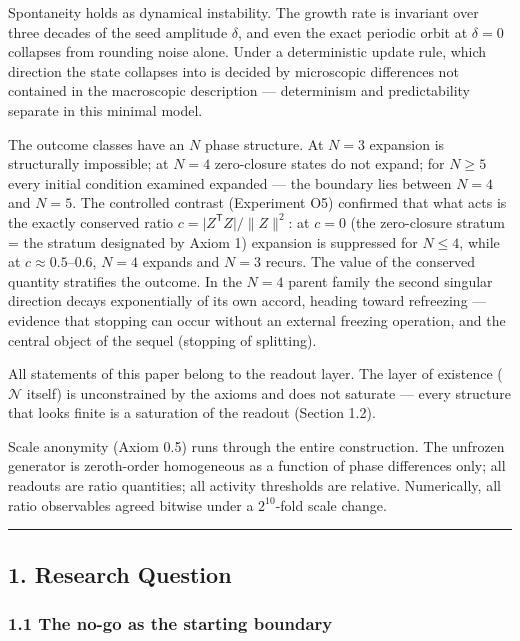 \documentclass[
  a4paper,
]{article}
\begin{document}
Spontaneity holds as dynamical instability. The growth rate is invariant
over three decades of the seed amplitude \(\delta\), and even the exact
periodic orbit at \(\delta=0\) collapses from rounding noise alone.
Under a deterministic update rule, which direction the state collapses
into is decided by microscopic differences not contained in the
macroscopic description --- determinism and predictability separate in
this minimal model.

The outcome classes have an \(N\) phase structure. At \(N=3\) expansion
is structurally impossible; at \(N=4\) zero-closure states do not
expand; for \(N\ge5\) every initial condition examined expanded --- the
boundary lies between \(N=4\) and \(N=5\). The controlled contrast
(Experiment O5) confirmed that what acts is the exactly conserved ratio
\(c=\lvert Z^{\mathsf T}Z\rvert/\lVert Z\rVert^2\): at \(c=0\) (the
zero-closure stratum = the stratum designated by Axiom 1) expansion is
suppressed for \(N\le4\), while at \(c\approx0.5\)--\(0.6\), \(N=4\)
expands and \(N=3\) recurs. The value of the conserved quantity
stratifies the outcome. In the \(N=4\) parent family the second singular
direction decays exponentially of its own accord, heading toward
refreezing --- evidence that stopping can occur without an external
freezing operation, and the central object of the sequel (stopping of
splitting).

All statements of this paper belong to the readout layer. The layer of
existence (\(\mathcal N\) itself) is unconstrained by the axioms and
does not saturate --- every structure that looks finite is a saturation
of the readout (Section 1.2).

Scale anonymity (Axiom 0.5) runs through the entire construction. The
unfrozen generator is zeroth-order homogeneous as a function of phase
differences only; all readouts are ratio quantities; all activity
thresholds are relative. Numerically, all ratio observables agreed
bitwise under a \(2^{10}\)-fold scale change.

\begin{center}\rule{0.5\linewidth}{0.5pt}\end{center}

\subsection{1. Research Question}\label{research-question}

\subsubsection{1.1 The no-go as the starting
boundary}\label{the-no-go-as-the-starting-boundary}
\end{document}
